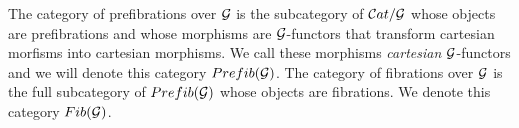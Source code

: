 \begin{comment}
{
\erojo

9. A \emph{clivage} is 
 a set $K$ of cartesian morphisms that verifies that for  each ${\alpha \mr{\varphi} \beta\ \in \cc{G}}$ and $X \in \cc{E}_\beta$, there is a unique morphism $s \in K$ over $\varphi$ with \mbox{target $X$.}

\vspace{1ex}

10. Every cleaved functor is a prefibration. Using choice it follows that every prefibration admits a clivage. 

\vspace{1ex}

11. A cleaved prefibration $\cc{E} \mr{F} \cc{G}$ with clivage $K$ is \emph{split} if the morphisms in  $K$ are closed under composition.

\vspace{1ex}

12. Every functor that admits a split clivage is a fibration. 

\vspace{2ex}
}
\end{comment}

The category of prefibrations over $\mathcal{G}$ is the subcategory of $\mathcal{C}at/\mathcal{G}$ whose objects are prefibrations and whose morphisms are $\mathcal{G}$-functors that transform cartesian morfisms into cartesian morphisms. We call these morphisms \textit{cartesian} $\mathcal{G}$-functors and we will denote this category $Prefib(\mathcal{G})$. The category of fibrations over $\mathcal{G}$ is the full subcategory of $Prefib(\mathcal{G})$ whose objects are fibrations. We denote this category $Fib(\mathcal{G})$.

